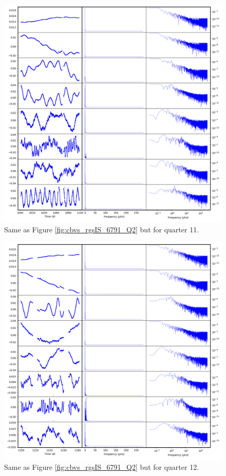 \begin{figure}
    \centering
    \includegraphics[width=\linewidth]{Chapter_Appended/AppB/cbv_6791_rgs_q11.png}
    \caption{Same as Figure \ref{fig:cbvs_rgsIS_6791_Q2} but for quarter 11.}
    \label{fig:cbvs_rgsIS_6791_Q11}
\end{figure}


\begin{figure}
    \centering
    \includegraphics[width=\linewidth]{Chapter_Appended/AppB/cbv_6791_rgs_q12.png}
    \caption{Same as Figure \ref{fig:cbvs_rgsIS_6791_Q2} but for quarter 12.}
    \label{fig:cbvs_rgsIS_6791_Q12}
\end{figure}


